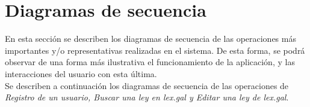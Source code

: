 \section{Diagramas de secuencia}

En esta sección se describen los diagramas de secuencia de las operaciones más importantes y/o representativas realizadas en el sistema. De esta forma, se podrá observar de una forma más ilustrativa el funcionamiento de la aplicación, y las interacciones del usuario con esta última. 
\\

Se describen a continuación los diagramas de secuencia de las operaciones de {\it Registro de un usuario, Buscar una ley en lex.gal y Editar una ley de lex.gal}.



